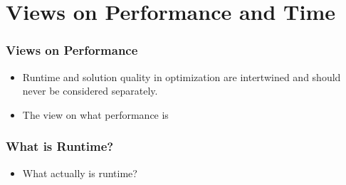 \documentclass[aspectratio=169,mathserif,notheorems]{beamer}%
\begin{document}
\section{Views on Performance and Time}%
%
\begin{frame}%
\frametitle{Views on Performance}%
\begin{itemize}%
\item Runtime and solution quality in optimization are intertwined and should never be considered separately.%
\item<2-> The view on what performance is\cite{HAFR2010RPBBOB2ES,NFR2011CCCOTD,WNT2010AAOAB,WWQLT2018ADCOAAPIBAWATCFEDASAIF}%
\end{itemize}%
%
%
%
%
\end{frame}%
%
\begin{frame}%
\frametitle{What is Runtime?}%
\begin{itemize}%
\item What actually is \alert{runtime}?%
\end{itemize}%
\end{frame}%
%
\end{document}
